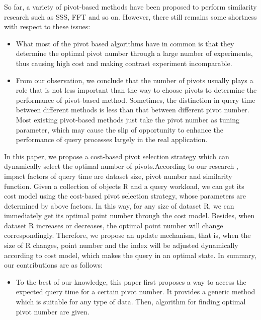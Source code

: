 \documentclass{vldb}
\begin{document}
So far, a variety of pivot-based methods have been proposed to perform similarity research such as SSS, FFT and so on. However, there still remains some shortness with respect to these issues:
\begin{itemize}
\item What most of the pivot based algorithms have in common is that they determine the optimal pivot number through a large number of experiments, thus causing high cost and making contrast experiment incomparable.
\end{itemize}
\begin{itemize}
\item From our observation, we conclude that the number of pivots usually plays a role that is not less important than the  way to choose pivots to determine the performance of pivot-based method. Sometimes, the distinction in query time between different methods is less than that between different pivot number. Most existing pivot-based methods just take the pivot number as tuning parameter, which may cause the slip of opportunity to enhance the performance of query processes largely in the real application. 
\end{itemize}
In this paper, we propose a cost-based pivot selection strategy which can dynamically select the optimal number of pivots.According to our research , impact factors of query time are dataset size, pivot number and similarity function. Given a collection of objects R and a query workload, we can get its cost model using the cost-based pivot selection strategy, whose parameters are determined by above factors. In this way, for any size of dataset R, we can immediately get its optimal point number through the cost model. Besides, when dataset R increases or decreases, the optimal point number will change correspondingly. Therefore, we propose an update mechanism, that is, when the size of R changes, point number and the index will be adjusted dynamically according to cost model, which makes the query in an optimal state.
In summary, our contributions are as follows:
\begin{itemize}
\item To the best of our knowledge, this paper first proposes a way to access the expected query time for a certain pivot number. It provides a generic method which is suitable for any type of data. Then, algorithm for finding optimal pivot number are given.
\end{itemize}
\end{document}
